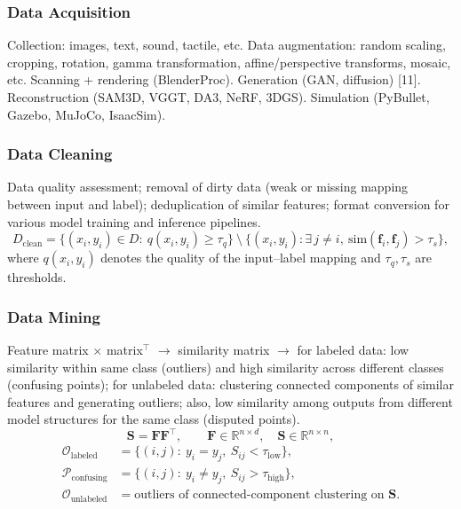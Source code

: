 \documentclass[12pt,a4paper]{article}
\begin{document}
\subsubsection{Data Acquisition}
Collection: images, text, sound, tactile, etc.
Data augmentation: random scaling, cropping, rotation, gamma transformation, affine/perspective transforms, mosaic, etc.
Scanning + rendering (BlenderProc).
Generation (GAN, diffusion) [11].
Reconstruction (SAM3D, VGGT, DA3, NeRF, 3DGS).
Simulation (PyBullet, Gazebo, MuJoCo, IsaacSim).

\subsubsection{Data Cleaning}
Data quality assessment; removal of dirty data (weak or missing mapping between input and label); deduplication of similar features; format conversion for various model training and inference pipelines.
\begin{equation}
D_{\mathrm{clean}}=\bigl\{(x_i,y_i)\in D:\ q(x_i,y_i)\ge\tau_q\bigr\}
\ \setminus\ \bigl\{(x_i,y_i):\exists\,j\neq i,\ \mathrm{sim}(\mathbf{f}_i,\mathbf{f}_j)>\tau_s\bigr\},
\label{eq:data-cleaning}
\end{equation}
where $q(x_i,y_i)$ denotes the quality of the input--label mapping and $\tau_q,\tau_s$ are thresholds.

\subsubsection{Data Mining}
Feature matrix $\times$ matrix$^{\top}$ $\rightarrow$ similarity matrix $\rightarrow$ for labeled data: low similarity within same class (outliers) and high similarity across different classes (confusing points); for unlabeled data: clustering connected components of similar features and generating outliers; also, low similarity among outputs from different model structures for the same class (disputed points).
\begin{equation}
\mathbf{S}=\mathbf{F}\mathbf{F}^{\top},\qquad \mathbf{F}\in\mathbb{R}^{n\times d},\quad \mathbf{S}\in\mathbb{R}^{n\times n},
\label{eq:data-mining-similarity}
\end{equation}
\begin{equation}
\begin{aligned}
\mathcal{O}_{\mathrm{labeled}}&=\bigl\{(i,j):\ y_i=y_j,\ S_{ij}<\tau_{\mathrm{low}}\bigr\},\\
\mathcal{P}_{\mathrm{confusing}}&=\bigl\{(i,j):\ y_i\neq y_j,\ S_{ij}>\tau_{\mathrm{high}}\bigr\},\\
\mathcal{O}_{\mathrm{unlabeled}}&=\text{outliers of connected-component clustering on }\mathbf{S}.
\end{aligned}
\label{eq:data-mining-rule}
\end{equation}
\end{document}
